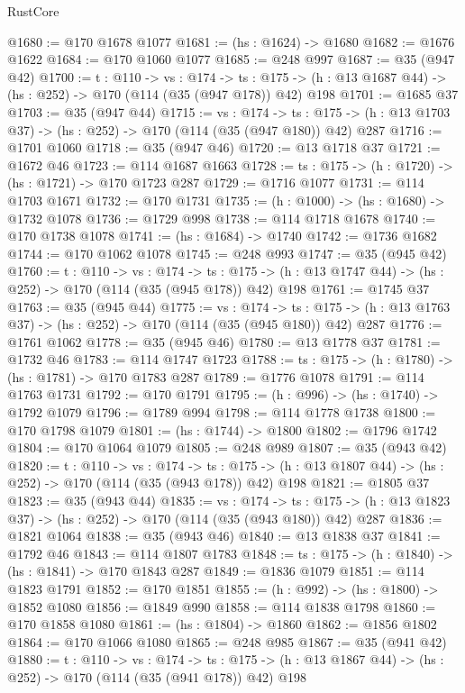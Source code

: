 \begin{lexlean}{RustCore}
\begin{coremodule}
@1680 := @170 @1678 @1077
@1681 := (hs : @1624) -> @1680
@1682 := @1676 @1622
@1684 := @170 @1060 @1077
@1685 := @248 @997
@1687 := @35 (@947 @42)
@1700 := {t : @110} ->
  {vs : @174} ->
  {ts : @175} -> (h : @13 @1687 @44) -> (hs : @252) -> @170 (@114 (@35 (@947 @178)) @42) @198
@1701 := @1685 @37
@1703 := @35 (@947 @44)
@1715 := {vs : @174} ->
  {ts : @175} -> (h : @13 @1703 @37) -> (hs : @252) -> @170 (@114 (@35 (@947 @180)) @42) @287
@1716 := @1701 @1060
@1718 := @35 (@947 @46)
@1720 := @13 @1718 @37
@1721 := @1672 @46
@1723 := @114 @1687 @1663
@1728 := {ts : @175} -> (h : @1720) -> (hs : @1721) -> @170 @1723 @287
@1729 := @1716 @1077
@1731 := @114 @1703 @1671
@1732 := @170 @1731
@1735 := (h : @1000) -> (hs : @1680) -> @1732 @1078
@1736 := @1729 @998
@1738 := @114 @1718 @1678
@1740 := @170 @1738 @1078
@1741 := (hs : @1684) -> @1740
@1742 := @1736 @1682
@1744 := @170 @1062 @1078
@1745 := @248 @993
@1747 := @35 (@945 @42)
@1760 := {t : @110} ->
  {vs : @174} ->
  {ts : @175} -> (h : @13 @1747 @44) -> (hs : @252) -> @170 (@114 (@35 (@945 @178)) @42) @198
@1761 := @1745 @37
@1763 := @35 (@945 @44)
@1775 := {vs : @174} ->
  {ts : @175} -> (h : @13 @1763 @37) -> (hs : @252) -> @170 (@114 (@35 (@945 @180)) @42) @287
@1776 := @1761 @1062
@1778 := @35 (@945 @46)
@1780 := @13 @1778 @37
@1781 := @1732 @46
@1783 := @114 @1747 @1723
@1788 := {ts : @175} -> (h : @1780) -> (hs : @1781) -> @170 @1783 @287
@1789 := @1776 @1078
@1791 := @114 @1763 @1731
@1792 := @170 @1791
@1795 := (h : @996) -> (hs : @1740) -> @1792 @1079
@1796 := @1789 @994
@1798 := @114 @1778 @1738
@1800 := @170 @1798 @1079
@1801 := (hs : @1744) -> @1800
@1802 := @1796 @1742
@1804 := @170 @1064 @1079
@1805 := @248 @989
@1807 := @35 (@943 @42)
@1820 := {t : @110} ->
  {vs : @174} ->
  {ts : @175} -> (h : @13 @1807 @44) -> (hs : @252) -> @170 (@114 (@35 (@943 @178)) @42) @198
@1821 := @1805 @37
@1823 := @35 (@943 @44)
@1835 := {vs : @174} ->
  {ts : @175} -> (h : @13 @1823 @37) -> (hs : @252) -> @170 (@114 (@35 (@943 @180)) @42) @287
@1836 := @1821 @1064
@1838 := @35 (@943 @46)
@1840 := @13 @1838 @37
@1841 := @1792 @46
@1843 := @114 @1807 @1783
@1848 := {ts : @175} -> (h : @1840) -> (hs : @1841) -> @170 @1843 @287
@1849 := @1836 @1079
@1851 := @114 @1823 @1791
@1852 := @170 @1851
@1855 := (h : @992) -> (hs : @1800) -> @1852 @1080
@1856 := @1849 @990
@1858 := @114 @1838 @1798
@1860 := @170 @1858 @1080
@1861 := (hs : @1804) -> @1860
@1862 := @1856 @1802
@1864 := @170 @1066 @1080
@1865 := @248 @985
@1867 := @35 (@941 @42)
@1880 := {t : @110} ->
  {vs : @174} ->
  {ts : @175} -> (h : @13 @1867 @44) -> (hs : @252) -> @170 (@114 (@35 (@941 @178)) @42) @198

\end{coremodule}
\end{lexlean}
